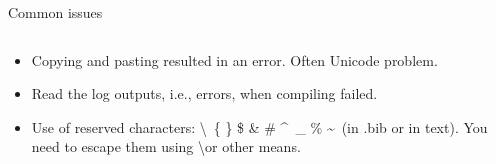 \begin{frame}{Common issues}
    \begin{columns}[t]
        \begin{column}{.45\textwidth}
            \begin{itemize}
                \item Copying and pasting resulted in an error. Often Unicode problem. 
                \item Read the log outputs, i.e., errors, when compiling failed. 
                \item Use of reserved characters: \textbackslash\ \{ \} \$ \& \# \textasciicircum\ \_ \% \textasciitilde\ (in .bib or in text). You need to escape them using \textbackslash or other means.
            \end{itemize}    
        \end{column}\hfill
        \begin{column}{.45\textwidth}
         \end{column}
    \end{columns}
\end{frame}